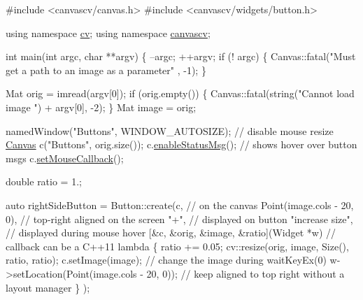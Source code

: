 \begin{DoxyCode}
\textcolor{preprocessor}{#include <canvascv/canvas.h>}
\textcolor{preprocessor}{#include <canvascv/widgets/button.h>}

\textcolor{keyword}{using namespace }\hyperlink{namespacecv}{cv};
\textcolor{keyword}{using namespace }\hyperlink{namespacecanvascv}{canvascv};

\textcolor{keywordtype}{int} main(\textcolor{keywordtype}{int} argc, \textcolor{keywordtype}{char} **argv)
\{
    --argc;
    ++argv;
    \textcolor{keywordflow}{if} (! argc)
    \{
        Canvas::fatal(\textcolor{stringliteral}{"Must get a path to an image as a parameter"} , -1);
    \}

    Mat orig = imread(argv[0]);
    \textcolor{keywordflow}{if} (orig.empty())
    \{
        Canvas::fatal(\textcolor{keywordtype}{string}(\textcolor{stringliteral}{"Cannot load image "}) + argv[0], -2);
    \}
    Mat image = orig;

    namedWindow(\textcolor{stringliteral}{"Buttons"}, WINDOW\_AUTOSIZE); \textcolor{comment}{// disable mouse resize}
    \hyperlink{classcanvascv_1_1Canvas}{Canvas} c(\textcolor{stringliteral}{"Buttons"}, orig.size());
    c.\hyperlink{classcanvascv_1_1Canvas_a402c43a42c0089c48a96e5303c1c1fe8}{enableStatusMsg}(); \textcolor{comment}{// shows hover over button msgs}
    c.\hyperlink{classcanvascv_1_1Canvas_acf6e5d4b40aec610b0dc8c4f6bf93ac1}{setMouseCallback}();

    \textcolor{keywordtype}{double} ratio = 1.;

    \textcolor{keyword}{auto} rightSideButton = Button::create(c,                                 \textcolor{comment}{// on the canvas}
                                          Point(image.cols - 20, 0),         \textcolor{comment}{// top-right aligned on the
       screen}
                                          \textcolor{stringliteral}{"+"},                               \textcolor{comment}{// displayed on button}
                                          \textcolor{stringliteral}{"increase size"},                   \textcolor{comment}{// displayed during mouse
       hover}
                                          [&c, &orig, &image, &ratio](Widget *w) \textcolor{comment}{// callback can be a C++11
       lambda}
    \{
        ratio += 0.05;
        cv::resize(orig, image, Size(), ratio, ratio);
        c.setImage(image);  \textcolor{comment}{// change the image during waitKeyEx(0)}
        w->setLocation(Point(image.cols - 20, 0)); \textcolor{comment}{// keep aligned to top right without a layout manager}
    \}
    );


\end{DoxyCode}
